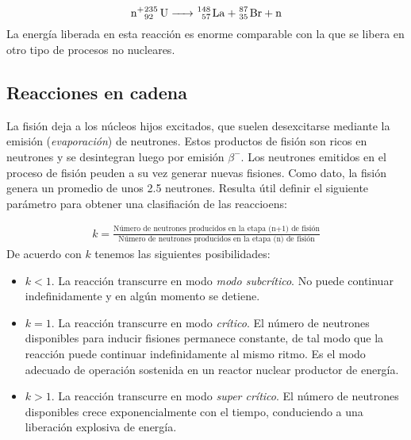 \begin{equation}
\ce{n+^235_92 U -> ^148_57 La + ^87_35 Br + n}
\end{equation}
La energía liberada en esta reacción es enorme comparable con la que se libera en otro tipo de procesos no nucleares. 


\subsection{Reacciones en cadena}

La fisión deja a los núcleos hijos excitados, que suelen desexcitarse mediante la emisión (\textit{evaporación}) de neutrones. Estos productos de fisión son ricos en neutrones y se desintegran luego por emisión $\beta^-$. Los neutrones emitidos en el proceso de fisión peuden a su vez generar nuevas fisiones. Como dato, la fisión  genera un promedio de unos 2.5 neutrones. Resulta útil definir el siguiente parámetro para obtener una clasifiación de las reaccioens:

\begin{eqnarray}    
    k = \frac{\text{Número de neutrones producidos en la etapa (n+1) de fisión}}{\text{Número de neutrones producidos en la etapa (n) de fisión}}
\end{eqnarray}
De acuerdo con $k$ tenemos las siguientes posibilidades:

\begin{itemize}
    \item $k<1$. La reacción transcurre en modo \textit{modo subcrítico}. No puede continuar indefinidamente y en algún momento se detiene.
    \item $k=1$. La reacción transcurre en modo \textit{crítico}. El número de neutrones disponibles para inducir fisiones permanece constante, de tal modo que la reacción puede continuar indefinidamente al mismo ritmo. Es el modo adecuado de operación sostenida en un reactor nuclear productor de energía.
    \item $k>1$. La reacción transcurre en modo \textit{super crítico}. El número de neutrones disponibles crece exponencialmente con el tiempo, conduciendo a una liberación explosiva de energía.
\end{itemize}

